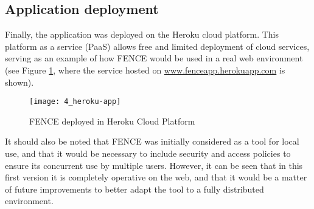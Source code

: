 \subsection{Application deployment}

Finally, the application was deployed on the Heroku cloud platform. This platform as a service (PaaS) allows free and limited deployment of cloud services, serving as an example of how FENCE would be used in a real web environment (see Figure \ref{fig:heroku-app}, where the service hosted on \url{www.fenceapp.herokuapp.com} is shown).
	
	\begin{figure}
		\centering
		\texttt{[image: 4\_heroku-app]}
		\caption[FENCE deployed in Heroku]{FENCE deployed in Heroku Cloud Platform}
		\label{fig:heroku-app}
	\end{figure}

It should also be noted that FENCE was initially considered as a tool for local use, and that it would be necessary to include security and access policies to ensure its concurrent use by multiple users. However, it can be seen that in this first version it is completely operative on the web, and that it would be a matter of future improvements to better adapt the tool to a fully distributed environment.